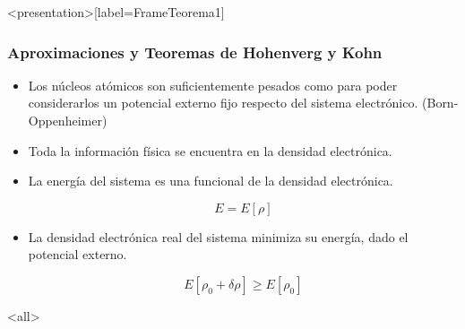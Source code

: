 \mode*
\begin{frame}<presentation>[label=FrameTeorema1]
 \frametitle{Aproximaciones y Teoremas de Hohenverg y Kohn}

 \begin{itemize}

   \item Los núcleos atómicos son suficientemente pesados como para poder considerarlos un potencial externo fijo respecto del sistema electrónico.
     (Born-Oppenheimer)

   \item Toda la información física se encuentra en la densidad electrónica.

   \item La energía del sistema es una funcional de la densidad electrónica.

     $$ E = E[\rho] $$

   \item La densidad electrónica real del sistema minimiza su energía, dado el potencial externo.

     $$ E[\rho_0 + \delta \rho ] \ge E[\rho_0]$$

 \end{itemize}

\end{frame}

\mode<all>
